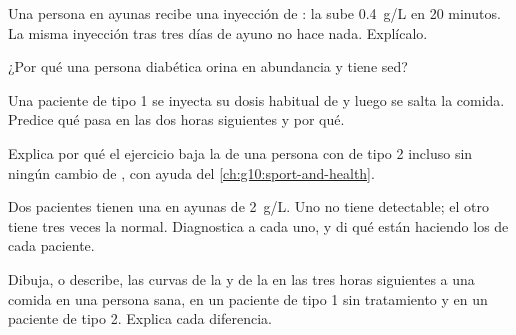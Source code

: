 \begin{exercise}[$\star\star$]\label{exo:g12:glucose-and-diabetes:8}
Una persona en ayunas recibe una inyección de : la 
sube \qty{0.4}{g/L} en 20 minutos. La misma inyección tras tres días de
ayuno no hace nada. Explícalo.
\end{exercise}

\begin{exercise}[$\star\star$]\label{exo:g12:glucose-and-diabetes:9}
¿Por qué una persona diabética orina en abundancia y tiene sed?
\end{exercise}

\begin{exercise}[$\star\star$]\label{exo:g12:glucose-and-diabetes:10}
Una paciente de tipo 1 se inyecta su dosis habitual de  y luego
se salta la comida. Predice qué pasa en las dos horas siguientes y por
qué.
\end{exercise}

\begin{exercise}[$\star\star$]\label{exo:g12:glucose-and-diabetes:11}
Explica por qué el ejercicio baja la  de una persona con
 de tipo 2 incluso sin ningún cambio de , con ayuda del
\cref{ch:g10:sport-and-health}.
\end{exercise}

\begin{exercise}[$\star\star\star$]\label{exo:g12:glucose-and-diabetes:12}
Dos pacientes tienen una  en ayunas de \qty{2}{g/L}. Uno no
tiene  detectable; el otro tiene tres veces la  normal.
Diagnostica a cada uno, y di qué están haciendo los  de cada
paciente.
\end{exercise}

\begin{exercise}[$\star\star\star$]\label{exo:g12:glucose-and-diabetes:13}
Dibuja, o describe, las curvas de la  y de la  en las
tres horas siguientes a una comida en una persona sana, en un paciente
de tipo 1 sin tratamiento y en un paciente de tipo 2. Explica cada
diferencia.
\end{exercise}

